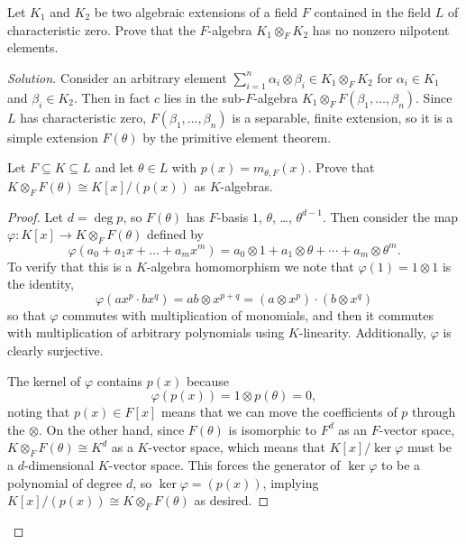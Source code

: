 \documentclass[10pt]{article}
\providecommand{\tensor}{\otimes}
\newenvironment{soln}{\begin{proof}[Solution]}{\end{proof}}
\begin{document}
\pagebreak

\begin{problem}
    [\S14.4\#8]
    Let $K_1$ and $K_2$ be two algebraic extensions of a field $F$
    contained in the field $L$ of characteristic zero.
    Prove that the $F$-algebra $K_1\tensor_F K_2$
    has no nonzero nilpotent elements.
\end{problem}

\begin{soln}
    Consider an arbitrary element
    $\sum_{i=1}^n \alpha_i\tensor\beta_i\in K_1\tensor_F K_2$
    for $\alpha_i\in K_1$ and $\beta_i\in K_2$.
    Then in fact $c$ lies in the sub-$F$-algebra
    $K_1\tensor_F F(\beta_1,\dots,\beta_n)$.
    Since $L$ has characteristic zero, $F(\beta_1,\dots,\beta_n)$
    is a separable, finite extension, so it is a simple extension
    $F(\theta)$ by the primitive element theorem.

    \begin{lemma}
	[\S14.4\#7]
        Let $F\subseteq K\subseteq L$ and let $\theta\in L$
	with $p(x) = m_{\theta,F}(x)$.
	Prove that $K\tensor_F F(\theta) \cong K[x]/(p(x))$ as $K$-algebras.
    \end{lemma}

    \begin{proof}
        Let $d = \deg p$, so $F(\theta)$ has $F$-basis
	$1$, $\theta$, \dots, $\theta^{d-1}$. Then
	consider the map $\varphi\colon K[x]\to K\tensor_F F(\theta)$
	defined by
	\begin{equation*}
	    \varphi(a_0 + a_1x + \dots + a_mx^m)
	    = a_0\tensor 1 + a_1\tensor\theta
	    + \cdots + a_m\tensor \theta^m.
	\end{equation*}
	To verify that this is a $K$-algebra homomorphism
	we note that $\varphi(1) = 1\tensor 1$ is the identity,
	\begin{equation*}
	    \varphi(ax^p\cdot bx^q) = ab\tensor x^{p+q}
	    = (a\tensor x^p)\cdot (b\tensor x^q)
	\end{equation*}
	so that $\varphi$ commutes with multiplication of monomials,
	and then it commutes with multiplication of arbitrary polynomials
	using $K$-linearity. Additionally, $\varphi$ is clearly surjective.

	The kernel of $\varphi$ contains $p(x)$ because
	\begin{equation*}
	    \varphi(p(x)) = 1\tensor p(\theta) = 0,
	\end{equation*}
	noting that $p(x)\in F[x]$ means that
	we can move the coefficients of $p$ through the $\tensor$.
	On the other hand, since $F(\theta)$ is isomorphic to
	$F^d$ as an $F$-vector space, $K\otimes_F F(\theta)\cong K^d$
	as a $K$-vector space, which means that
	$K[x]/\ker\varphi$ must be a $d$-dimensional $K$-vector space.
	This forces the generator of $\ker\varphi$
	to be a polynomial of degree $d$, so $\ker\varphi = (p(x))$,
	implying $K[x]/(p(x))\cong K\otimes_F F(\theta)$ as desired.
    \end{proof}


\end{soln}
\end{document}
